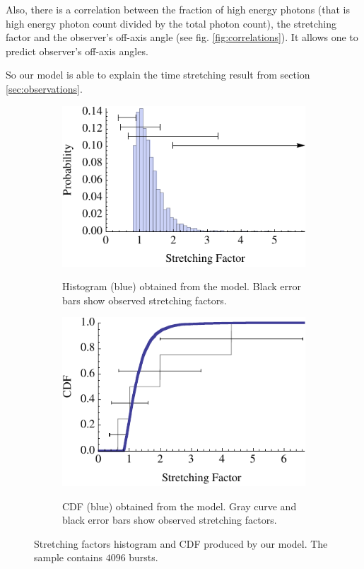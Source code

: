\documentclass{article}
\begin{document}
	Also, there is a correlation between the fraction of high energy photons (that is high energy photon count divided by the total photon count), the stretching factor and the observer's off-axis angle (see fig. \ref{fig:correlations}).
	It allows one to predict observer's off-axis angles.

	So our model is able to explain the time stretching result from section \ref{sec:observations}.

\begin{figure}
	\hspace*{\fill}
	\begin{subfigure}{0.45\textwidth}
		\includegraphics[width=\textwidth]{kappaDistributionHistogram}
		\label{fig:kappaDistributionHistogram}
		\caption{Histogram (blue) obtained from the model. Black error bars show observed stretching factors.}
	\end{subfigure}
	\hfill
	\begin{subfigure}{0.45\textwidth}
		\includegraphics[width=\textwidth]{kappaDistributionCDF}
		\label{fig:kappaDistributionCDF}
		\caption{CDF (blue) obtained from the model. Gray curve and black error bars show observed stretching factors.}
	\end{subfigure}
	\hspace*{\fill}
	\caption{Stretching factors histogram and CDF produced by our model. The sample contains $4096$ bursts.}
	\label{fig:kappaDistribution}
\end{figure}
\end{document}
